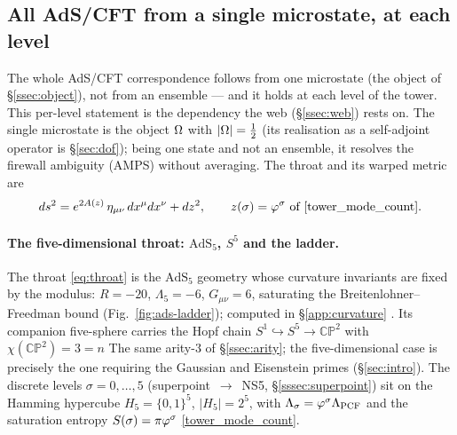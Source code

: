 \subsection{All AdS/CFT from a single microstate, at each level}\label{ssec:adscft}
The whole AdS/CFT correspondence follows from one microstate (the object of \S\ref{ssec:object}),
not from an ensemble --- and it holds at each level of the tower. This per-level statement is the
dependency the web (\S\ref{ssec:web}) rests on. The single microstate is the object
$\Omega$ with $|\Omega|=\tfrac12$ (its realisation as a self-adjoint operator is \S\ref{sec:dof}); being
one state and not an ensemble, it resolves the
firewall ambiguity (AMPS) without averaging.
The throat and its warped metric are
\begin{equation}\label{eq:throat}
  ds^{2}=e^{2A(z)}\,\eta_{\mu\nu}\,dx^{\mu}dx^{\nu}+dz^{2},
  \qquad z(\sigma)=\varphi^{\sigma}\ \text{of \eqref{tower_mode_count}}.
\end{equation}
\paragraph{The five-dimensional throat: $\mathrm{AdS}_5$, $S^5$ and the ladder.}
The throat \eqref{eq:throat} is the $\mathrm{AdS}_5$ geometry whose curvature invariants are fixed
by the modulus: $R=-20$, $\Lambda_5=-6$, $G_{\mu\nu}=6$, saturating the
Breitenlohner--Freedman bound (Fig.~\ref{fig:ads-ladder}); computed in \S\ref{app:curvature} .
Its companion five-sphere carries the Hopf chain $S^1\hookrightarrow S^5\to\mathbb{CP}^2$ with
$\chi(\mathbb{CP}^2)=3=n$
The same arity-$3$ of
\S\ref{ssec:arity}; the five-dimensional case is precisely the one requiring the Gaussian and
Eisenstein primes (\S\ref{sec:intro}). The discrete levels $\sigma=0,\dots,5$
(superpoint~$\to$~NS5, \S\ref{sssec:superpoint}) sit on the Hamming hypercube
$H_5=\{0,1\}^5$, $|H_5|=2^{5}$, with
$\Lambda_\sigma=\varphi^{\sigma}\Lambda_{\mathrm{PCF}}$ and the saturation entropy
$S(\sigma)=\pi\varphi^{\sigma}$ \eqref{tower_mode_count}.


